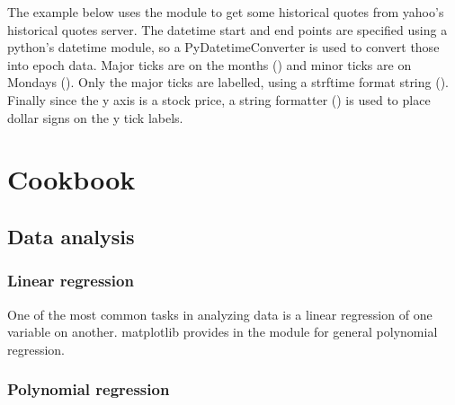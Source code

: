 \documentclass[]{book}
\begin{document}
The example below uses the  module to get
some historical quotes from yahoo's historical quotes server.  The
datetime start and end points are specified using a python's datetime
module, so a PyDatetimeConverter is used to convert those into epoch
data.  Major ticks are on the months () and minor
ticks are on Mondays ().  Only the major ticks
are labelled, using a strftime format string ().
Finally since the y axis is a stock price, a string formatter
() is used to place dollar signs on the y
tick labels.









\chapter{Cookbook}
\label{cha:cookbook}

\section{Data analysis}

\subsection{Linear regression}
\label{cbook:linear_regression}

One of the most common tasks in analyzing data is a linear regression
of one variable on another.  matplotlib provides  in the
 module for general polynomial regression.





\subsection{Polynomial regression}
\label{cbook:polynomial_regression}
\end{document}
